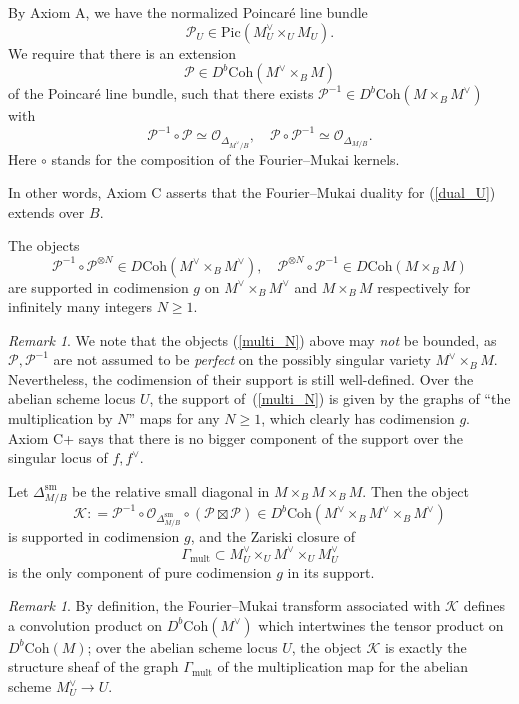\documentclass[11pt]{amsart}
\theoremstyle{plain}
\theoremstyle{definition}
\theoremstyle{remark}
\newtheorem{rmk}[thm]{Remark}
\newcommand{\CK}{{\mathcal K}}
\newcommand{\CO}{{\mathcal O}}
\newcommand{\CP}{{\mathcal P}}
\begin{document}
 By Axiom A, we have the normalized Poincar\'e line bundle
\[
\CP_U \in \mathrm{Pic}\left( M^\vee_U \times_U M_U\right).
\]
We require that there is an extension 
\[
\CP \in D^b\mathrm{Coh}\left( M^\vee \times_B M \right)
\]
of the Poincar\'e line bundle, such that there exists $\CP^{-1} \in D^b\mathrm{Coh}(M \times_B M^\vee)$ with 
\[
\CP^{-1}\circ\CP\simeq \CO_{\Delta_{M^\vee/B}}, \quad \CP \circ \CP^{-1} \simeq \CO_{\Delta_{M/B}}.
\]
Here $\circ$ stands for the composition of the Fourier--Mukai kernels. 

In other words, Axiom C asserts that the Fourier--Mukai duality for (\ref{dual_U}) extends over $B$.
\medskip

 The objects 
\begin{equation}\label{multi_N}
\CP^{-1}\circ \CP^{\otimes N} \in D\mathrm{Coh}(M^\vee \times_B M^\vee), \quad \CP ^{\otimes N}\circ \CP^{-1} \in D\mathrm{Coh}(M \times_B M)
\end{equation}
are supported in codimension $g$ on $M^\vee \times_B M^\vee$ and $M\times_B M$ respectively for infinitely many integers $N\geq 1$.

\begin{rmk}
We note that the objects (\ref{multi_N}) above may \emph{not} be bounded, as $\CP, \CP^{-1}$ are not assumed to be \emph{perfect} on the possibly singular variety $M^\vee\times_B M$. Nevertheless, the codimension of their support is still well-defined. Over the abelian scheme locus $U$, the support of~(\ref{multi_N}) is given by the graphs of ``the multiplication by $N$'' maps for any $N\geq 1$, which clearly has codimension $g$. Axiom C+ says that there is no bigger component of the support over the singular locus of $f, f^\vee$.
\end{rmk}

\medskip

 Let $\Delta^{\mathrm{sm}}_{M/B}$ be the relative small diagonal in $M\times_B M \times_B M$. Then the object
\[
\CK: = \CP^{-1}\circ \CO_{\Delta^{\mathrm{sm}}_{M/B}}\circ \left( \CP \boxtimes \CP \right) \in D^b\mathrm{Coh}(M^\vee \times_B M^\vee \times_B M^\vee)
\]
is supported in codimension $g$, and the Zariski closure of
\[
\Gamma_{\mathrm{mult}} \subset M^\vee_U \times_U M^\vee \times_U M_U^\vee
\]
is the only component of pure codimension $g$ in its support.

\begin{rmk}
By definition, the Fourier--Mukai transform associated with $\CK$ defines a convolution product on $D^b\mathrm{Coh}(M^\vee)$ which intertwines the tensor product on $D^b\mathrm{Coh}(M)$; over the abelian scheme locus $U$, the object $\CK$ is exactly the structure sheaf of the graph $\Gamma_{\mathrm{mult}}$ of the multiplication map for the abelian scheme $M^\vee_U \to U$.
\end{rmk}
\end{document}
